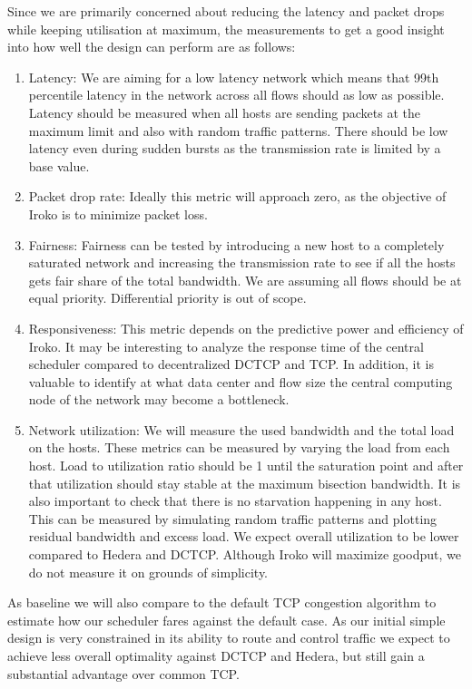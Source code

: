 Since we are primarily concerned about reducing the latency and packet drops 
while keeping utilisation at maximum, the measurements to get a good insight 
into how well the design can perform are as follows:
\begin{enumerate}

\item Latency: We are aiming for a low latency network which means that 99th 
percentile latency in the network across all flows should as low as possible. 
Latency should be measured when all hosts are sending packets at the maximum 
limit and also with random traffic patterns. There should be low latency even 
during sudden bursts as the transmission rate is limited by a base value.

\item Packet drop rate: Ideally this metric will approach zero, as the 
objective of Iroko is to minimize packet loss.

\item Fairness: Fairness can be tested by introducing a new host to a 
completely saturated network and increasing the transmission rate to see if all 
the hosts gets fair share of the total bandwidth. We are assuming all flows 
should be at equal priority. Differential priority is out of scope.

\item Responsiveness: This metric depends on the predictive power and 
efficiency of Iroko. It may be interesting to analyze the response time of the 
central scheduler compared to decentralized DCTCP and TCP. In addition, it is 
valuable to identify at what data center and flow size the central computing 
node of the network may become a bottleneck.

\item Network utilization: We will measure the used bandwidth and the total 
load on the hosts. These metrics can be measured by varying the load from each 
host. Load to utilization ratio should be 1 until the saturation point and 
after that utilization should stay stable at the maximum bisection bandwidth.
It is also important to check that there is no starvation happening in any 
host. This can be measured by simulating random traffic patterns and plotting 
residual bandwidth and excess load. We expect overall utilization to be lower 
compared to Hedera and DCTCP. Although Iroko will maximize goodput, we do not 
measure it on grounds of simplicity.

\end{enumerate}

As baseline we will also compare to the default TCP congestion algorithm to 
estimate how our scheduler fares against the default case. As our initial 
simple design is very constrained in its ability to route and control traffic 
we expect to achieve less overall optimality against DCTCP and Hedera, but 
still gain a substantial advantage over common TCP.
